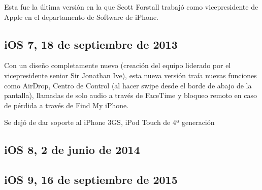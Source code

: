 Esta fue la última versión en la que Scott Forstall trabajó como vicepresidente de Apple en el departamento de Software de iPhone.

\subsection{iOS 7, 18 de septiembre de 2013}
Con un diseño completamente nuevo (creación del equipo liderado por el vicepresidente senior Sir Jonathan Ive), esta nueva versión traía nuevas funciones como AirDrop, Centro de Control (al hacer swipe desde el borde de abajo de la pantalla), llamadas de solo audio a través de FaceTime y bloqueo remoto en caso de pérdida a través de Find My iPhone.

Se dejó de dar soporte al iPhone 3GS, iPod Touch de 4ª generación 

\subsection{iOS 8, 2 de junio de 2014}

\subsection{iOS 9, 16 de septiembre de 2015}

\chapterend